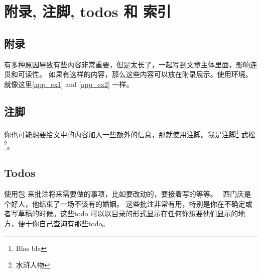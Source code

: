 \chapter{附录, 注脚, todos 和 索引}


\section{附录}

有多种原因导致有些内容非常重要，但是太长了，一起写到文章主体里面，影响连贯和可读性。
如果有这样的内容，那么这些内容可以放在附录展示。使用环境。
就像这里\autoref{app_ex1} and \autoref{app_ex2} 一样。



\section{注脚}

你也可能想要给文中的内容加入一些额外的信息，那就使用注脚。我是注脚\footnote{Blas bla} 武松\footnote{水浒人物}。



\section{Todos}

使用包 来批注将来需要做的事项，比如要改动的，要接着写的等等。
\ 西门庆是个好人，他结束了一场不该有的婚姻。
这些批注非常有用，特别是你在不确定或者写草稿的时候。这些todo
可以以目录的形式显示在任何你想要他们显示的地方，便于你自己查询有那些todo。


